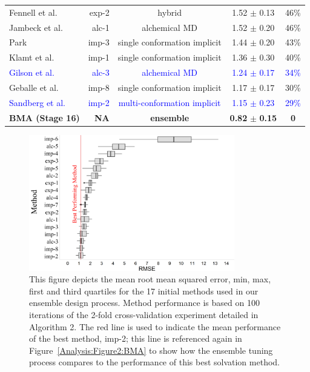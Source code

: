 \documentclass[12pt]{article}
\newcommand{\+}[1]{\ensuremath{\mathbf{#1}}}
\begin{document}
\begin{table}[t]
\begin{tabular}{l|r|c|c|c}
		Fennell et al.~\cite{Li:2014} & exp-2  & hybrid & 1.52 $\pm$ 0.13 & 46\%\\																
		Jambeck et al.~\cite{Jambeck:2013} & alc-1  & alchemical MD & 1.52 $\pm$ 0.20 & 46\%\\ 
		Park~\cite{Park:2014} & imp-3  & single conformation implicit & 1.44 $\pm$ 0.20 & 43\%\\
		Klamt et al.~\cite{Klamt:2010} & imp-1  & single conformation implicit & 1.36 $\pm$ 0.30 & 40\%\\	
		\textcolor{blue}{Gilson et al.~\cite{Muddana:2014}} & \textcolor{blue}{alc-3}  & \textcolor{blue}{alchemical MD} & \textcolor{blue}{1.24 $\pm$ 0.17} & \textcolor{blue}{34\%} \\ 
		Geballe et al.~\cite{Ellingson:2014} & imp-8  & single conformation implicit & 1.17 $\pm$ 0.17 & 30\%\\
		\textcolor{blue}{Sandberg et al.~\cite{Sandberg:2013}} & \textcolor{blue}{imp-2}  & \textcolor{blue}{multi-conformation implicit} & \textcolor{blue}{1.15 $\pm$ 0.23} & \textcolor{blue}{29\%}\\
		\textbf{BMA (Stage 16)} & \textbf{NA} & \textbf{ensemble} & \textbf{0.82} $\pm$ \textbf{0.15} & \textbf{0} \\
		\hline
	\end{tabular}
	\label{Analysis:Table1:Methods}
\end{table}

\hspace{10mm}

\begin{figure}[h!]
	\centering
	\includegraphics[keepaspectratio,width=0.8\textwidth]{Figures/Component_Model_RMSE}
	\caption{This figure depicts the mean root mean squared error, min, max, first and third quartiles for the 17 initial methods used in our ensemble design process. Method performance is based on 100 iterations of the 2-fold cross-validation experiment detailed in Algorithm 2. The red line is used to indicate the mean performance of the best method, imp-2; this line is referenced again in Figure~\ref{Analysis:Figure2:BMA} to show how the ensemble tuning process compares to the performance of this best solvation method.}
	\label{Analysis:Figure1:Methods}
\end{figure}
\end{document}
